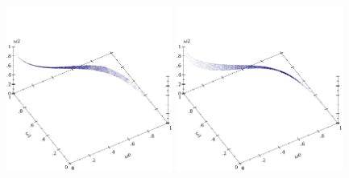 \renewcommand{\subfigurewidth}{2.15in}
\begin{figure}[tb!]\centering%
\includegraphics[width=\subfigurewidth]{results/normal-normals-wide1-points}%
\includegraphics[width=\subfigurewidth]{results/normal-normals-wide2-points}%

\end{figure}
